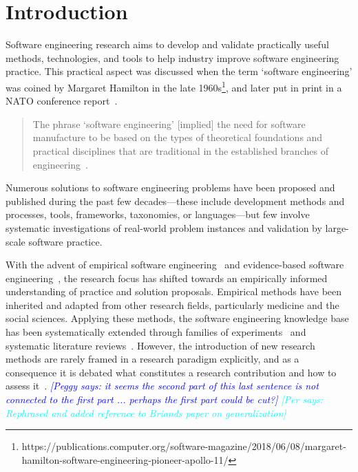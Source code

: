 \documentclass[graybox]{svmult}
\newcommand{\peggy}[1]{\textcolor{blue}{{\it [Peggy says: #1]}}}
\newcommand{\per}[1]{\textcolor{cyan}{{\it [Per says: #1]}}}
\newcommand{\peggy}[1]{}
\newcommand{\per}[1]{}
\begin{document}
\section{Introduction}
\label{sec:intro}

Software engineering research aims to develop and validate practically useful methods, technologies, and tools to help industry improve software engineering practice. This practical aspect was discussed when the term `software engineering' was coined by Margaret Hamilton in the late 1960s\footnote{https://publications.computer.org/software-magazine/2018/06/08/margaret-hamilton-software-engineering-pioneer-apollo-11/}, and later put in print in a NATO conference report~\cite{Nato1968}. 

\begin{quote}
{The phrase `software engineering'  [implied] the need for software manufacture to be based on the types of theoretical foundations and practical disciplines that are traditional in the established branches of engineering}~\cite[p. 13]{Nato1968}. 
\end{quote}

Numerous solutions to software engineering problems have been proposed and published during the past few decades---these include development methods and processes, tools, frameworks, taxonomies, or languages---but few involve systematic investigations of real-world problem instances and validation by large-scale software practice.

With the advent of empirical software engineering~\cite{Basili86} and evidence-based software engineering~\cite{Kitchenham04}, the research focus has shifted towards an empirically informed understanding of practice and solution proposals. Empirical methods have been inherited and adapted from other research fields, particularly medicine and the social sciences. Applying these methods, the software engineering knowledge base has been systematically extended through families of experiments~\cite{Basili99} and systematic literature reviews~\cite{Kitchenham15}. However, the introduction of new research methods are rarely  framed in a research paradigm explicitly, and as a consequence it is debated what constitutes a research contribution and how to assess it~\cite{BriandGeneralization2017}.
\peggy{it seems the second part of this last sentence is not connected to the first part ... perhaps the first part could be cut?} \per{Rephrased and added reference to Briands paper on generalization}
\end{document}
